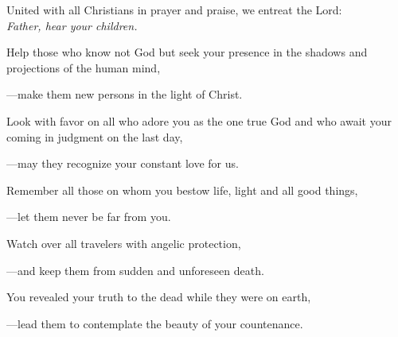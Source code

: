 \intercessions\indent

\begin{hangpar}

United with all Christians in prayer and praise, we entreat the Lord:\\
\emph{Father, hear your children.}

\medskip Help those who know not God but seek your presence in the shadows and projections of the human mind,

{\color{red}---\thinspace}make them new persons in the light of Christ.

\medskip Look with favor on all who adore you as the one true God and who await your coming in judgment on the last day,

{\color{red}---\thinspace}may they recognize your constant love for us.

\medskip Remember all those on whom you bestow life, light and all good things,

{\color{red}---\thinspace}let them never be far from you.

\medskip Watch over all travelers with angelic protection,

{\color{red}---\thinspace}and keep them from sudden and unforeseen death.

\medskip You revealed your truth to the dead while they were on earth,

{\color{red}---\thinspace}lead them to contemplate the beauty of your countenance.

\medskip

\end{hangpar}